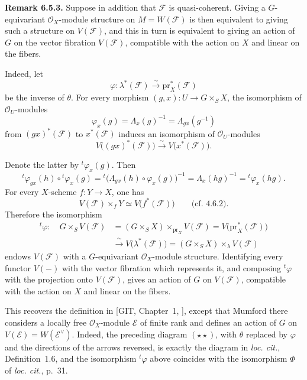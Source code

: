 \medskip
\noindent{}\textbf{Remark 6.5.3.}
Suppose in addition that \(\mathcal F\) is quasi-coherent. Giving a
\(G\)-equivariant \(\mathcal O_X\)-module structure on
\(M=W(\mathcal F)\) is then equivalent to giving such a structure on
\(V(\mathcal F)\), and this in turn is equivalent to giving an action
of \(G\) on the vector fibration \(V(\mathcal F)\), compatible with
the action on \(X\) and linear on the fibers.

Indeed, let
\[
  \varphi:\lambda^*(\mathcal F)
  \xrightarrow{\ \sim\ }\mathrm{pr}_X^*(\mathcal F)
\]
be the inverse of \(\theta\). For every morphism
\((g,x):U\to G\times_S X\), the isomorphism of
\(\mathcal O_U\)-modules
\[
  \varphi_x(g)
  =\Lambda_x(g)^{-1}
  =\Lambda_{gx}(g^{-1})
\]
from \((gx)^*(\mathcal F)\) to \(x^*(\mathcal F)\) induces an
isomorphism of \(\mathcal O_U\)-modules
\[
  V\bigl((gx)^*(\mathcal F)\bigr)
  \xrightarrow{\ \sim\ }V\bigl(x^*(\mathcal F)\bigr).
\]

Denote the latter by \({}^{t}\!\varphi_x(g)\). Then
\[
  {}^{t}\!\varphi_{gx}(h)\circ{}^{t}\!\varphi_x(g)
  =
  {}^{t}\!\bigl(\Lambda_{gx}(h)\circ\varphi_x(g)\bigr)^{-1}
  =
  \Lambda_x(hg)^{-1}
  =
  {}^{t}\!\varphi_x(hg).
\]
For every \(X\)-scheme \(f:Y\to X\), one has
\[
  V(\mathcal F)\times_fY\simeq V\bigl(f^*(\mathcal F)\bigr)
  \qquad\text{(cf. 4.6.2).}
\]
Therefore the isomorphism
\[
\begin{aligned}
  {}^{t}\!\varphi:\quad
  G\times_SV(\mathcal F)
  &=(G\times_SX)\times_{\mathrm{pr}_X}V(\mathcal F)
   =V\bigl(\mathrm{pr}_X^*(\mathcal F)\bigr)\\
  &\xrightarrow{\ \sim\ }
   V\bigl(\lambda^*(\mathcal F)\bigr)
   =(G\times_SX)\times_\lambda V(\mathcal F)
\end{aligned}
\]
endows \(V(\mathcal F)\) with a \(G\)-equivariant
\(\mathcal O_X\)-module structure. Identifying every functor \(V(-)\)
with the vector fibration which represents it, and composing
\({}^{t}\!\varphi\) with the projection onto \(V(\mathcal F)\), gives
an action of \(G\) on \(V(\mathcal F)\), compatible with the action on
\(X\) and linear on the fibers.

This recovers the definition in [GIT, Chapter~1, ], except that
Mumford there considers a locally free \(\mathcal O_X\)-module
\(\mathcal E\) of finite rank and defines an action of \(G\) on
\(V(\mathcal E)=W(\mathcal E^\vee)\). Indeed, the preceding diagram
\((\star\star)\), with \(\theta\) replaced by \(\varphi\) and the
directions of the arrows reversed, is exactly the diagram in
\emph{loc. cit.}, Definition~1.6, and the isomorphism
\({}^{t}\!\varphi\) above coincides with the isomorphism \(\Phi\) of
\emph{loc. cit.}, p.~31.


